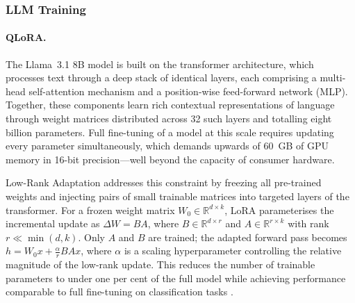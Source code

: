 
\subsubsection{LLM Training}

\paragraph{QLoRA.}

The Llama~3.1 8B model is built on the transformer architecture, which
processes text through a deep stack of identical layers, each comprising a
multi-head self-attention mechanism and a position-wise feed-forward network
(MLP). Together, these components learn rich contextual representations of
language through weight matrices distributed across 32 such layers and totalling
eight billion parameters. Full fine-tuning of a model at this scale requires
updating every parameter simultaneously, which demands upwards of 60~GB of GPU
memory in 16-bit precision---well beyond the capacity of consumer hardware.

Low-Rank Adaptation \citep[LoRA;][]{hu2021lora} addresses this constraint by
freezing all pre-trained weights and injecting pairs of small trainable matrices
into targeted layers of the transformer. For a frozen weight matrix
$W_0 \in \mathbb{R}^{d \times k}$, LoRA parameterises the incremental update as
$\Delta W = BA$, where $B \in \mathbb{R}^{d \times r}$ and
$A \in \mathbb{R}^{r \times k}$ with rank $r \ll \min(d, k)$.
Only $A$ and $B$ are trained; the adapted forward pass becomes
$h = W_0 x + \tfrac{\alpha}{r} BA x$,
where $\alpha$ is a scaling hyperparameter controlling the relative magnitude of
the low-rank update. This reduces the number of trainable parameters to under
one per cent of the full model while achieving performance comparable to full
fine-tuning on classification tasks \citep{hu2021lora}.

